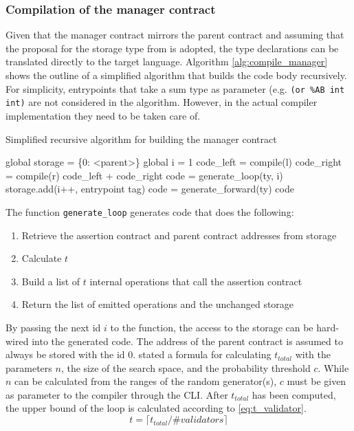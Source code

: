 \subsubsection{Compilation of the manager contract}
Given that the manager contract mirrors the parent contract and assuming that the proposal for the storage type from  is adopted, the type declarations can be translated directly to the target language. Algorithm \ref{alg:compile_manager} shows the outline of a simplified algorithm that builds the code body recursively. For simplicity, entrypoints that take a sum type as parameter (e.g. \texttt{(or \%AB int int)} are not considered in the algorithm. However, in the actual compiler implementation they need to be taken care of. 
\begin{algorithm}
\caption{Simplified recursive algorithm for building the manager contract}\label{alg:compile_manager}
	\begin{algorithmic}[0]
	\State global storage = \{0: <parent>\} 
	\State global i = 1 
	\State code\_left = compile(l)
	\State code\_right = compile(r)
	\State \Return code\_left + code\_right
	\Else
	\State code = generate\_loop(ty, i)
	\State storage.add(i++, entrypoint tag)
	\Else
	\State code = generate\_forward(ty)
	\EndIf
	\State \Return code
	\EndIf
	\EndFunction
	\end{algorithmic}
\end{algorithm}

The function \texttt{generate\_loop} generates code that does the following:
\begin{enumerate}
\item Retrieve the assertion contract and parent contract addresses from storage
\item Calculate $t$
\item Build a list of $t$ internal operations that call the assertion contract
\item Return the list of emitted operations and the unchanged storage
\end{enumerate}
By passing the next id $i$ to the function, the access to the storage can be hard-wired into the generated code. The address of the parent contract is assumed to always be stored with the id 0.  stated a formula for calculating $t_{total}$ with the parameters $n$, the size of the search space, and the probability threshold $c$. While $n$ can be calculated from the ranges of the random generator(s), $c$ must be given as parameter to the compiler through the CLI. After $t_{total}$ has been computed, the upper bound of the loop is calculated according to \eqref{eq:t_validator}. 
\begin{equation}\label{eq:t_validator}
t = \lceil t_{total} / \#validators \rceil
\end{equation}


